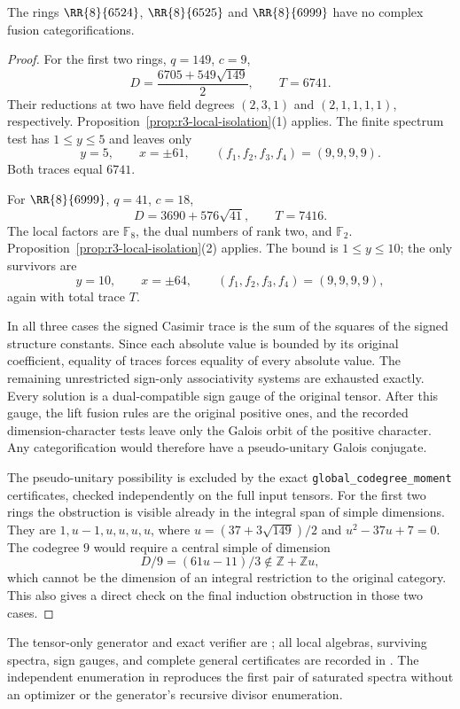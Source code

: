\begin{theorem}\label{thm:r3-arithmetic-exclusions}
The rings $\RR{8}{6524}$, $\RR{8}{6525}$ and $\RR{8}{6999}$
have no complex fusion categorifications.
\end{theorem}
\begin{proof}
For the first two rings, $q=149$, $c=9$,
\[
 D=\frac{6705+549\sqrt{149}}2,\qquad T=6741.
\]
Their reductions at two have field degrees $(2,3,1)$ and
$(2,1,1,1,1)$, respectively. Proposition~\ref{prop:r3-local-isolation}(1)
applies. The finite spectrum test has $1\leq y\leq5$ and leaves
only
\[
 y=5,\qquad x=\pm61,\qquad (f_1,f_2,f_3,f_4)=(9,9,9,9).
\]
Both traces equal $6741$.

For $\RR{8}{6999}$, $q=41$, $c=18$,
\[
 D=3690+576\sqrt{41},\qquad T=7416.
\]
The local factors are $\mathbb F_8$, the dual numbers of rank two,
and $\mathbb F_2$. Proposition~\ref{prop:r3-local-isolation}(2)
applies. The bound is $1\leq y\leq10$; the only survivors are
\[
 y=10,\qquad x=\pm64,\qquad (f_1,f_2,f_3,f_4)=(9,9,9,9),
\]
again with total trace $T$.

In all three cases the signed Casimir trace is the sum of the
squares of the signed structure constants. Since each absolute
value is bounded by its original coefficient, equality of traces
forces equality of every absolute value. The remaining unrestricted
sign-only associativity systems are exhausted exactly. Every
solution is a dual-compatible sign gauge of the original tensor.
After this gauge, the lift fusion rules are the original positive
ones, and the recorded dimension-character tests leave only the
Galois orbit of the positive character. Any categorification would
therefore have a pseudo-unitary Galois conjugate.

The pseudo-unitary possibility is excluded by the exact
\texttt{global\_codegree\_moment} certificates, checked independently
on the full input tensors. For the first two rings the obstruction
is visible already in the integral span of simple dimensions.
They are $1,u-1,u,u,u,u$, where
$u=(37+3\sqrt{149})/2$ and $u^2-37u+7=0$.
The codegree $9$ would require a central simple of dimension
\[
 D/9=(61u-11)/3\notin\mathbb Z+\mathbb Z u,
\]
which cannot be the dimension of an integral restriction to the
original category. This also gives a direct check on the final
induction obstruction in those two cases.
\end{proof}

The tensor-only generator and exact verifier are
; all local algebras,
surviving spectra, sign gauges, and complete general certificates
are recorded in .
The independent enumeration in
 reproduces
the first pair of saturated spectra without an optimizer or the
generator's recursive divisor enumeration.

